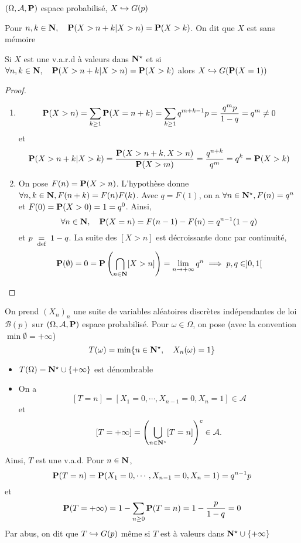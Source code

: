 \begin{thm}
    \Hyp $(\Omega, \mathcal A, \P)$ espace probabilisé, $X\suit G(p)$
     \begin{concenum}
     \item Pour $n,k\in \N,\quad \P(X>n+k|X>n)=\P(X>k)$. On dit que $X$ est sans mémoire
     \item Si $X$ est une v.a.r.d à valeurs dans $\N^\star$ et si $\forall  n,k\in \N,\quad \P(X>n+k|X>n)=\P(X>k)$ alors $X\suit G(\P(X=1))$
    \end{concenum}
\end{thm}

\begin{proof}~
\begin{enumerate}
    \item \[
            \P(X>n)=\sum_{k\geq 1}\P(X=n+k)=\sum_{k\geq 1}q^{m+k-1}p= \frac{q^mp}{1-q}=q^m \neq 0
    \] et \[
    \P(X>n+k|X>k)= \frac{\P(X>n+k,X>n)}{\P(X>m)}=\frac{q^{n+k}}{q^m}=q^k=\P(X>k)
    \] 
\item On pose $F(n)=\P(X>n)$. L'hypothèse donne  $\forall  n,k \in  \N, F(n+k)=F(n)F(k)$. Avec $q=F(1)$, on a  $\forall  n\in \N^\star, F(n)=q^n$ et $F(0)=\P(X>0)=1=q^0$. Ainsi,  \[
        \forall  n\in \N,\quad \P(X=n)=F(n-1)-F(n)=q^{n-1}(1-q)
\] 
et $p\defeq1-q$. La suite des $[X>n]$ est décroissante donc par continuité,  \[
    \P(\emptyset)=0=\P \left( \bigcap_{n \in  \N} [X>n] \right) =\lim_{n\to+\infty}q^n\implies p,q\in ]0,1[
\] 
\end{enumerate}
\end{proof}

\begin{rem}
    On prend $(X_n)_n$ une suite de variables aléatoires discrètes indépendantes de loi $\mathcal  B(p)$ sur $(\Omega, \mathcal A, \P)$ espace probabilisé. Pour $\omega \in  \Omega$, on pose (avec la convention $\min \emptyset=+\infty$)\[
        T(\omega)=\min \{n\in  \N^\star,\quad X_n(\omega)=1\} 
    \]
    \begin{itemize}
        \item $T(\Omega)=\N^\star\cup \{+\infty\} $ est dénombrable
        \item On a \[
                [T=n]=[X_1=0,\cdots ,X_{n-1}=0,X_n=1]\in \mathcal  A
        \] 
        et \[
            [T=+\infty]= \left( \bigcup_{n\in \N^\star}[T=n]  \right)^c\in \mathcal  A.
        \] 
    \end{itemize}
    Ainsi, $T$ est une v.a.d. Pour $n\in \N$, \[
        \P(T=n)=\P(X_1=0,\cdots ,X_{n-1}=0,X_n=1)=q^{n-1}p
    \] 
    et \[
        \P(T=+\infty)=1-\sum_{n\geq 0}\P(T=n)=1-\frac{p}{1-q}=0
    \] 
    Par abus, on dit que $T\suit G(p)$ même si  $T$ est à valeurs dans $\N^\star\cup \{+\infty\} $
\end{rem}

